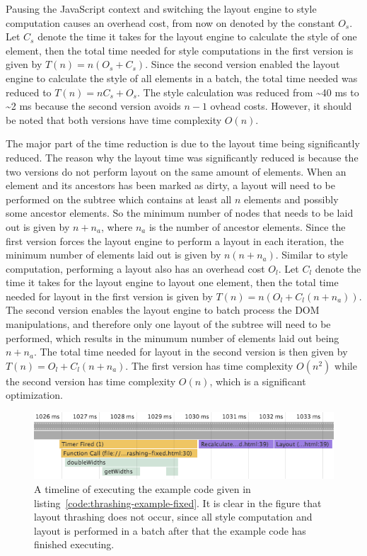 \documentclass[a4paper,11pt]{kth-mag}
\begin{document}
        Pausing the JavaScript context and switching the layout engine to style computation causes an overhead cost, from now on denoted by the constant $O_{s}$.
        Let $C_{s}$ denote the time it takes for the layout engine to calculate the style of one element, then the total time needed for style computations in the first version is given by $T(n) = n(O_s + C_s)$.
        Since the second version enabled the layout engine to calculate the style of all elements in a batch, the total time needed was reduced to $T(n) = nC_s + O_s$.
        The style calculation was reduced from \textasciitilde40 ms to \textasciitilde2 ms because the second version avoids $n - 1$ ovhead costs.
        However, it should be noted that both versions have time complexity $O(n)$.
        
        The major part of the time reduction is due to the layout time being significantly reduced.
        The reason why the layout time was significantly reduced is because the two versions do not perform layout on the same amount of elements.
        When an element and its ancestors has been marked as dirty, a layout will need to be performed on the subtree which contains at least all $n$ elements and possibly some ancestor elements.
        So the minimum number of nodes that needs to be laid out is given by $n + n_{a}$, where $n_a$ is the number of ancestor elements.
        Since the first version forces the layout engine to perform a layout in each iteration, the minimum number of elements laid out is given by $n(n + n_a)$.
        Similar to style computation, performing a layout also has an overhead cost $O_{l}$.
        Let $C_{l}$ denote the time it takes for the layout engine to layout one element, then the total time needed for layout in the first version is given by $T(n) = n(O_{l} + C_{l}(n + n_a))$.
        The second version enables the layout engine to batch process the \gls{DOM} manipulations, and therefore only one layout of the subtree will need to be performed, which results in the minumum number of elements laid out being $n + n_a$.
        The total time needed for layout in the second version is then given by $T(n) = O_{l} + C_{l}(n + n_a)$.
        The first version has time complexity $O(n^2)$ while the second version has time complexity $O(n)$, which is a significant optimization.
        \begin{figure}[h]
          \centering
          \includegraphics[scale=0.5]{images/layout-thrashing-example-1-fixed}
          \caption{A timeline of executing the example code given in listing~\ref{code:thrashing-example-fixed}. It is clear in the figure that layout thrashing does not occur, since all style computation and layout is performed in a batch after that the example code has finished executing.}
          \label{fig:layout-thrashing-example-1-fixed}
        \end{figure}
\end{document}
